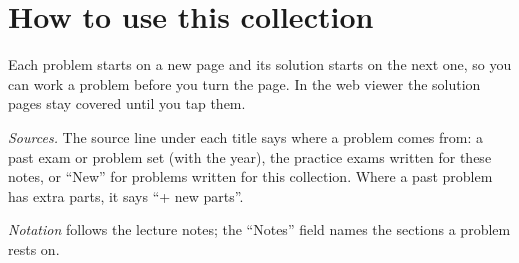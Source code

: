 \documentclass[11pt]{article}
\begin{document}
\makelecheader
\probheads

\tableofcontents

\clearpage
\markboth{}{}
\section*{How to use this collection}
Each problem starts on a new page and its solution starts on the next one, so
you can work a problem before you turn the page. In the web viewer the
solution pages stay covered until you tap them.

\emph{Sources.} The source line under each title says where a problem comes
from: a past exam or problem set (with the year), the practice exams written
for these notes, or ``New'' for problems written for this collection. Where a
past problem has extra parts, it says ``+ new parts''.

\emph{Notation} follows the lecture notes; the ``Notes'' field names the
sections a problem rests on.



\end{document}
